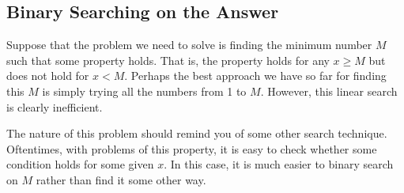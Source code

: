 \documentclass[11pt]{book}
\begin{document}
\subsection{Binary Searching on the Answer}

Suppose that the problem we need to solve is finding the minimum number $M$ such that some property holds. That is, the property holds for any $x \ge M$ but does not hold for $x < M$. Perhaps the best approach we have so far for finding this $M$ is simply trying all the numbers from 1 to $M$. However, this linear search is clearly inefficient.

The nature of this problem should remind you of some other search technique. Oftentimes, with problems of this property, it is easy to check whether some condition holds for some given $x$. In this case, it is much easier to binary search on $M$ rather than find it some other way.
\end{document}
